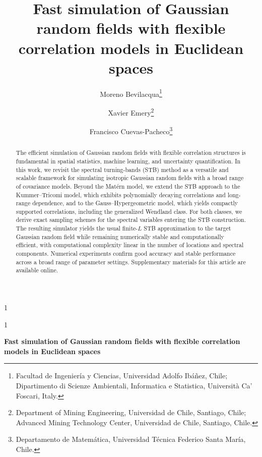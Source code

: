\documentclass[
  12pt]{article}
\newcommand{\anon}{1}
\begin{document}
\def\spacingset#1{\renewcommand{\baselinestretch}%
{#1}\small\normalsize} \spacingset{1}




\anon
{
  \title{\bfseries Fast simulation of Gaussian random fields with flexible correlation models in Euclidean spaces}
  \author{
    Moreno Bevilacqua\thanks{
      Facultad de Ingenier\'ia y Ciencias, Universidad Adolfo Ib\'a\~nez, Chile;
      Dipartimento di Scienze Ambientali, Informatica e Statistica, Universit\`a Ca' Foscari, Italy.
    }
    \and
    Xavier Emery\thanks{
      Department of Mining Engineering, Universidad de Chile, Santiago, Chile;
      Advanced Mining Technology Center, Universidad de Chile, Santiago, Chile.
    }
    \and
    Francisco Cuevas-Pacheco\thanks{
      Departamento de Matem\'atica, Universidad T\'ecnica Federico Santa Mar\'ia, Chile.
    }
  }
  \maketitle
} \fi

\anon
{
  \bigskip
  \bigskip
  \bigskip
  \begin{center}
    {\LARGE\bf Fast simulation of Gaussian random fields with flexible correlation models in Euclidean spaces}
\end{center}
  
} \fi

\bigskip
\begin{abstract}
The efficient simulation of Gaussian random fields with flexible correlation structures is fundamental in spatial statistics, machine learning, and uncertainty quantification. In this work, we revisit the spectral turning-bands (STB) method as a versatile and scalable framework for simulating isotropic Gaussian random fields with a broad range of covariance models. Beyond the Matérn model, we extend the STB approach to the Kummer--Tricomi model, which exhibits polynomially decaying correlations and long-range dependence, and to the Gauss--Hypergeometric model, which yields compactly supported correlations, including the generalized Wendland class. 
For both classes, we derive exact sampling schemes for the spectral variables entering the STB construction.
The resulting simulator yields the usual finite-$L$ STB approximation to the target Gaussian random field while remaining numerically stable and computationally efficient, with computational complexity linear in the number of locations and spectral components.
Numerical experiments confirm good accuracy and stable performance across a broad range of parameter settings. Supplementary materials for this article are available online.
\end{abstract}
\end{document}
